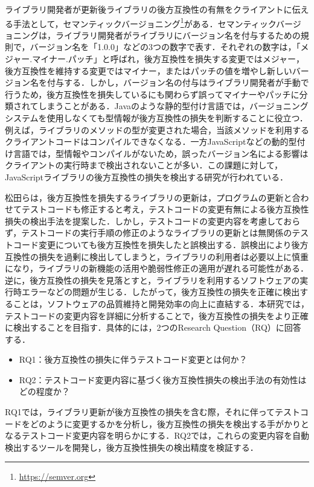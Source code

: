 \documentclass[11pt,dvipdfmx]{jreport}
\begin{document}
ライブラリ開発者が更新後ライブラリの後方互換性の有無をクライアントに伝える手法として，セマンティックバージョニング\footnote{\url{https://semver.org}}がある．セマンティックバージョニングは，ライブラリ開発者がライブラリにバージョン名を付与するための規則で，バージョン名を「1.0.0」などの3つの数字で表す．それぞれの数字は，「メジャー.マイナー.パッチ」と呼ばれ，後方互換性を損失する変更ではメジャー，後方互換性を維持する変更ではマイナー，またはパッチの値を増やし新しいバージョン名を付与する．しかし，バージョン名の付与はライブラリ開発者が手動で行うため，後方互換性を損失しているにも関わらず誤ってマイナーやパッチに分類されてしまうことがある．Javaのような静的型付け言語では，バージョニングシステムを使用しなくても型情報が後方互換性の損失を判断することに役立つ\cite{java-api-diff-tool}．例えば，ライブラリのメソッドの型が変更された場合，当該メソッドを利用するクライアントコードはコンパイルできなくなる．一方JavaScriptなどの動的型付け言語では，型情報やコンパイルがないため，誤ったバージョン名による影響はクライアントの実行時まで検出されないことが多い．この課題に対して，JavaScriptライブラリの後方互換性の損失を検出する研究が行われている．

松田らは，後方互換性を損失するライブラリの更新は，プログラムの更新と合わせてテストコードも修正すると考え，テストコードの変更有無による後方互換性損失の検出手法を提案した\cite{matsuda}．しかし，テストコードの変更内容を考慮しておらず，テストコードの実行手順の修正のようなライブラリの更新とは無関係のテストコード変更についても後方互換性を損失したと誤検出する．誤検出により後方互換性の損失を過剰に検出してしまうと，ライブラリの利用者は必要以上に慎重になり，ライブラリの新機能の活用や脆弱性修正の適用が遅れる可能性がある．逆に，後方互換性の損失を見落とすと，ライブラリを利用するソフトウェアの実行時エラーなどの問題が生じる．したがって，後方互換性の損失を正確に検出することは，ソフトウェアの品質維持と開発効率の向上に直結する．本研究では，テストコードの変更内容を詳細に分析することで，後方互換性の損失をより正確に検出することを目指す．具体的には，2つのResearch Question（RQ）に回答する．

\begin{itemize}
  \item RQ1：後方互換性の損失に伴うテストコード変更とは何か？
  \item RQ2：テストコード変更内容に基づく後方互換性損失の検出手法の有効性はどの程度か？
\end{itemize}

RQ1では，ライブラリ更新が後方互換性の損失を含む際，それに伴ってテストコードをどのように変更するかを分析し，後方互換性の損失を検出する手がかりとなるテストコード変更内容を明らかにする．RQ2では，これらの変更内容を自動検出するツールを開発し，後方互換性損失の検出精度を検証する．
\end{document}
